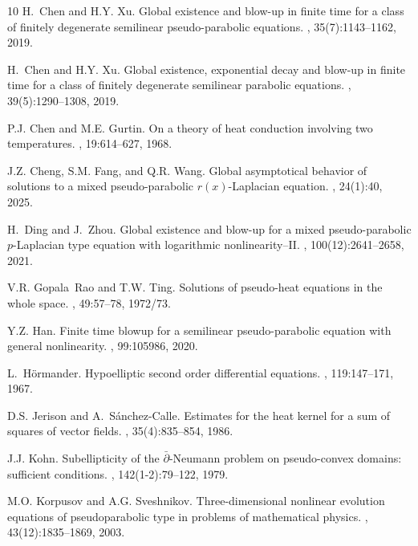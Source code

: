 \documentclass[11pt,a4paper]{article}
\numberwithin{equation}{section}
\numberwithin{remark}{section}
\begin{document}
\begin{thebibliography}{10}
H.~Chen and H.Y. Xu.
\newblock Global existence and blow-up in finite time for a class of finitely
  degenerate semilinear pseudo-parabolic equations.
, 35(7):1143--1162, 2019.

H.~Chen and H.Y. Xu.
\newblock Global existence, exponential decay and blow-up in finite time for a
  class of finitely degenerate semilinear parabolic equations.
, 39(5):1290--1308, 2019.

P.J. Chen and M.E. Gurtin.
\newblock On a theory of heat conduction involving two temperatures.
, 19:614--627, 1968.

J.Z. Cheng, S.M. Fang, and Q.R. Wang.
\newblock Global asymptotical behavior of solutions to a mixed
              pseudo-parabolic {$r(x)$}-{L}aplacian equation.
, 24(1):40, 2025.

H.~Ding and J.~Zhou.
\newblock Global existence and blow-up for a mixed pseudo-parabolic
              {$p$}-{L}aplacian type equation with logarithmic
              nonlinearity--{II}.
, 100(12):2641--2658, 2021.

V.R. Gopala~Rao and T.W. Ting.
\newblock Solutions of pseudo-heat equations in the whole space.
, 49:57--78, 1972/73.

Y.Z. Han.
\newblock Finite time blowup for a semilinear pseudo-parabolic equation with
  general nonlinearity.
, 99:105986, 2020.

L.~H\"{o}rmander.
\newblock Hypoelliptic second order differential equations.
, 119:147--171, 1967.

D.S. Jerison and A.~S\'{a}nchez-Calle.
\newblock Estimates for the heat kernel for a sum of squares of vector fields.
, 35(4):835--854, 1986.

J.J. Kohn.
\newblock Subellipticity of the {$\bar \partial $}-{N}eumann problem on
  pseudo-convex domains: sufficient conditions.
, 142(1-2):79--122, 1979.

M.O. Korpusov and A.G. Sveshnikov.
\newblock Three-dimensional nonlinear evolution equations of pseudoparabolic
  type in problems of mathematical physics.
, 43(12):1835--1869, 2003.


\end{thebibliography}
\end{document}
